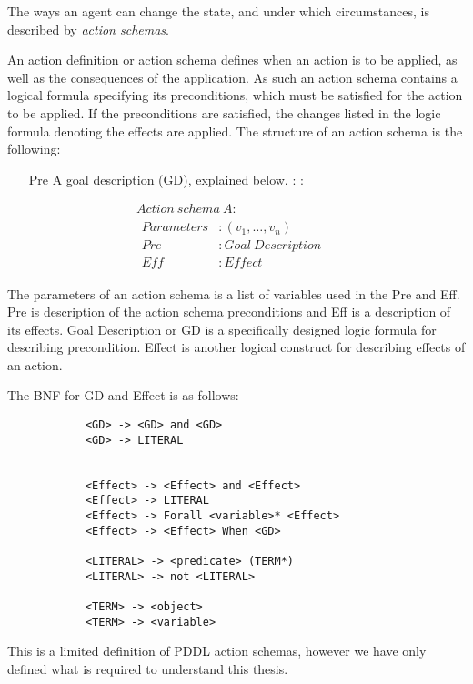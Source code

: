 \documentclass[../Master.tex]{subfiles}
\begin{document}
The ways an agent can change the state, and under which circumstances, is described by \textit{action schemas}. 
	
\begin{definition} \label{def:lrn:action-spec-def}
		An action definition or action schema defines when an action is to be applied, as well as the consequences of the application. As such an action schema contains a logical formula specifying its preconditions, which must be satisfied for the action to be applied. If the preconditions are satisfied, the changes listed in the logic formula denoting the effects are applied. The structure of an action schema is the following:
	\begin{itemize}
        \item[Pre] A goal description (GD), explained below. : :
    \end{itemize}
    \begin{equation*}
		\begin{array}{ll}
		Action~schema~A: & \\
		
		\begin{array}{ll}
		Parameters & : (v_1,\dots,v_n) \\  
		Pre	& : Goal~Description \\
		Eff & : Effect 
		\end{array}
		\end{array}
    \end{equation*}

	The parameters of an action schema is a list of variables used in the Pre and Eff. Pre is description of the action schema preconditions and Eff is a description of its effects. 
    Goal Description or GD is a specifically designed logic formula for describing precondition. Effect is another logical construct for describing effects of an action.

		The BNF for GD and Effect is as follows:
		
		\begin{lstlisting}
            <GD> -> <GD> and <GD>
            <GD> -> LITERAL
            
            
            <Effect> -> <Effect> and <Effect>
            <Effect> -> LITERAL
            <Effect> -> Forall <variable>* <Effect> 
            <Effect> -> <Effect> When <GD>
            
            <LITERAL> -> <predicate> (TERM*)
            <LITERAL> -> not <LITERAL>
            
            <TERM> -> <object>
            <TERM> -> <variable>
		\end{lstlisting}
		
		This is a limited definition of PDDL action schemas, however we have only defined what is required to understand this thesis.
	\end{definition}
	
\end{document}
